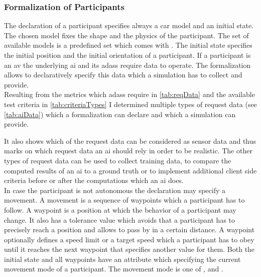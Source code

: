 \subsubsection{Formalization of Participants}
The declaration of a participant specifies always a car model and an initial state.
The chosen model fixes the shape and the physics of the participant.
The set of available models is a predefined set which comes with \beamng{}.
The initial state specifies the initial position and the initial orientation of a participant.
If a participant is an \gls{av} the underlying \gls{ai} and its \glspl{adas} require data to operate.
The formalization allows to declaratively specify this data which a simulation has to collect and provide.\\
Resulting from the metrics which \glspl{adas} require in \cref{tab:reqData} and the available test criteria in \cref{tab:criteriaTypes} I determined multiple types of request data (see \cref{tab:aiData}) which a formalization can declare and which a simulation can provide.
\begin{table}
    \caption{%
        Available request data --- Lists all types of request data which an \gls{ai} that registered at a simulation can possibly request and whether it can be considered as sensor data.
    }\label{tab:aiData}
    \medskip
    
\end{table}
It also shows which of the request data can be considered as sensor data and thus marks on which request data an \gls{ai} should rely in order to be realistic.
The other types of request data can be used to collect training data, to compare the computed results of an \gls{ai} to a ground truth or to implement additional client side criteria before or after the computations which an \gls{ai} does.\\
In case the participant is not autonomous the declaration may specify a movement.
A movement is a sequence of waypoints which a participant has to follow.
A waypoint is a position at which the behavior of a participant may change.
It also has a tolerance value which avoids that a participant has to precisely reach a position and allows to pass by in a certain distance.
A waypoint optionally defines a speed limit or a target speed which a participant has to obey until it reaches the next waypoint that specifies another value for them.
Both the initial state and all waypoints have an attribute which specifying the current movement mode of a participant.
The movement mode is one of \mmmanual{}, \mmautonomous{} and \mmtraining{}.
